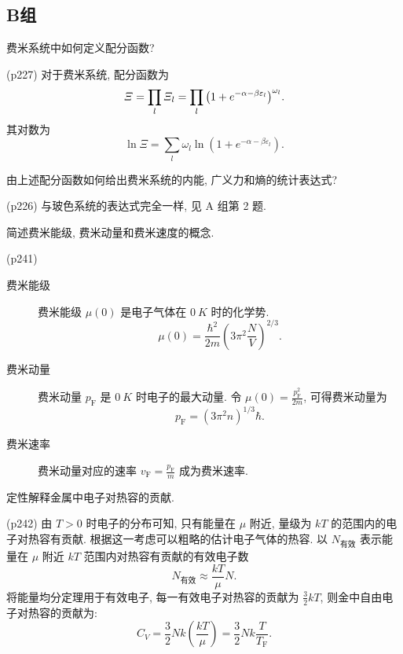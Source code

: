 \subsection{B组}
\begin{questions}
  \qt 费米系统中如何定义配分函数?
  \begin{solution}
    (p227) 对于费米系统, 配分函数为
    \begin{equation}
      \varXi = \prod_l\varXi_l = \prod_l \qty(1+e^{-\alpha-\beta\varepsilon_l})^{\omega_l}.
    \end{equation}
    其对数为
    \begin{equation}
      \ln\varXi = \sum_l \omega_l \ln(1+e^{-\alpha-\beta\varepsilon_l}).
    \end{equation}
  \end{solution}
  \qt 由上述配分函数如何给出费米系统的内能, 广义力和熵的统计表达式?
  \begin{solution}
    (p226) 与玻色系统的表达式完全一样, 见 A 组第 2 题.
  \end{solution}
  \qt 简述费米能级, 费米动量和费米速度的概念.
  \begin{solution}
    (p241)
    \begin{description}
      \item[费米能级] 费米能级 $\mu(0)$ 是电子气体在 $\SI{0}{K}$ 时的化学势.
        \begin{equation}
          \mu(0) = \frac{\hbar^2}{2m}(3\pi^2\frac{N}{V})^{2/3}.
        \end{equation}
      \item[费米动量] 费米动量 $p_\mathrm{F}$ 是 $\SI{0}{K}$ 时电子的最大动量. 令 $\mu(0) = \frac{p_\mathrm{F}^2}{2m}$, 可得费米动量为
        \begin{equation}
          p_\mathrm{F} = (3\pi^2 n)^{1/3} \hbar.
        \end{equation}
      \item[费米速率] 费米动量对应的速率 $v_{\mathrm{F}} = \frac{p_{\mathrm{F}}}{m}$ 成为费米速率.
    \end{description}
  \end{solution}
  \qt 定性解释金属中电子对热容的贡献.
  \begin{solution}
    (p242) 由 $T>0$ 时电子的分布可知, 只有能量在 $\mu$ 附近, 量级为 $kT$ 的范围内的电子对热容有贡献. 根据这一考虑可以粗略的估计电子气体的热容. 以 $N_{\text{有效}}$ 表示能量在 $\mu$ 附近 $kT$ 范围内对热容有贡献的有效电子数
    \begin{equation}
      N_{\text{有效}} \approx \frac{kT}{\mu} N.
    \end{equation}
    将能量均分定理用于有效电子, 每一有效电子对热容的贡献为 $\frac{3}{2}kT$, 则金中自由电子对热容的贡献为:
    \begin{equation}
      C_V = \frac{3}{2}Nk(\frac{kT}{\mu}) = \frac{3}{2}Nk\frac{T}{T_\mathrm{F}}.
    \end{equation}
  \end{solution}
\end{questions}